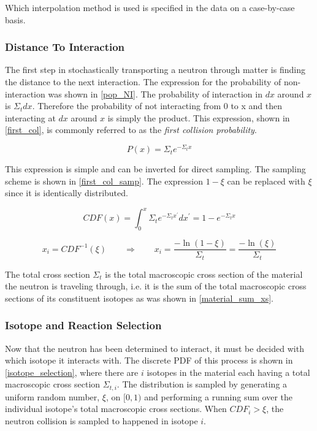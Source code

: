 Which interpolation method is used is specified in the data on a case-by-case basis.

\subsubsection{Distance To Interaction}

The first step in stochastically transporting a neutron through matter is finding the distance to the next interaction.  The expression for the probability of non-interaction was shown in \eqref{pop_NI}.  The probability of interaction in $dx$ around $x$ is $\Sigma_t dx$.  Therefore the probability of not interacting from 0 to x and then interacting at $dx$ around $x$ is simply the product.  This expression, shown in \eqref{first_col}, is commonly referred to as the \emph{first collision probability}.

\begin{equation}
\label{first_col}
P(x) = \Sigma_t e^{- \Sigma_t  x}
\end{equation}

This expression is simple and can be inverted for direct sampling.  The sampling scheme is shown in \eqref{first_col_samp}.  The expression $1-\xi$ can be replaced with $\xi$ since it is identically distributed.

\begin{equation}
\label{first_col}
CDF(x) = \int_0^x \Sigma_t e^{- \Sigma_t  x^\prime} dx^\prime = 1- e^{- \Sigma_t  x} 
\end{equation}

\begin{equation}
\label{first_col_samp}
x_i=CDF^{-1}(\xi) \qquad \Rightarrow \qquad x_i=\frac{-\ln(1-\xi) }{\Sigma_t}=\frac{-\ln(\xi) }{\Sigma_t}
\end{equation}

The total cross section $\Sigma_t$ is the total macroscopic cross section of the material the neutron is traveling through, i.e. it is the sum of the total macroscopic cross sections of its constituent isotopes as was shown in \eqref{material_sum_xs}.

\subsubsection{Isotope and Reaction Selection}

Now that the neutron has been determined to interact, it must be decided with which isotope it interacts with.  The discrete PDF of this process is shown in \eqref{isotope_selection}, where there are $i$ isotopes in the material each having a total macroscopic cross section $\Sigma_{t,i}$.  The distribution is sampled by generating a uniform random number, $\xi$, on $[0,1)$ and performing a running sum over the individual isotope's total macroscopic cross sections.  When $CDF_i > \xi$, the neutron collision is sampled to happened in isotope $i$.

